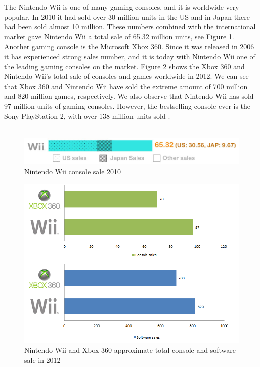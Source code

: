 The Nintendo Wii is one of many gaming consoles, and it is worldwide very popular. In 2010 it had sold over 30 million units in the US and in Japan there had been sold almost 10 million. These numbers combined with the international market gave Nintendo Wii a total sale of 65.32 million units, see Figure \ref{fig:ConsoleWarWii}. Another gaming console is the Microsoft Xbox 360. Since it was released in 2006 it has experienced strong sales number, and it is today with Nintendo Wii one of the leading gaming consoles on the market. Figure \ref{fig:XboxWiiSales} shows the Xbox 360 and Nintendo Wii's total sale of consoles and games worldwide in 2012. We can see that Xbox 360 and Nintendo Wii have sold the extreme amount of 700 million and 820 million games, respectively. We also observe that Nintendo Wii has sold 97 million units of gaming consoles. However, the bestselling console ever is the Sony PlayStation 2, with over 138 million units sold \cite{statistics2012}. \\ \\

\begin{figure}[h!]
\begin{center}
\includegraphics[scale=0.5]{consolewarwii}
\caption[Nitendo Wii console sale]{Nintendo Wii console sale 2010 \cite{statistics2012}}
\label{fig:ConsoleWarWii}
\end{center}
\end{figure}

\begin{figure}[h!]
\begin{center}
\includegraphics[scale=0.7]{xboxwiisales}
\caption[Nitendo Wii and Xbox 360 sales]{Nintendo Wii and Xbox 360 approximate total console and software sale in 2012 \cite{nintendolife} \cite{microsoftxbox} \cite{vgchartzxbox} \cite{vgchartzwii} \cite{vgchartzhardware}}
\label{fig:XboxWiiSales}
\end{center}
\end{figure}

